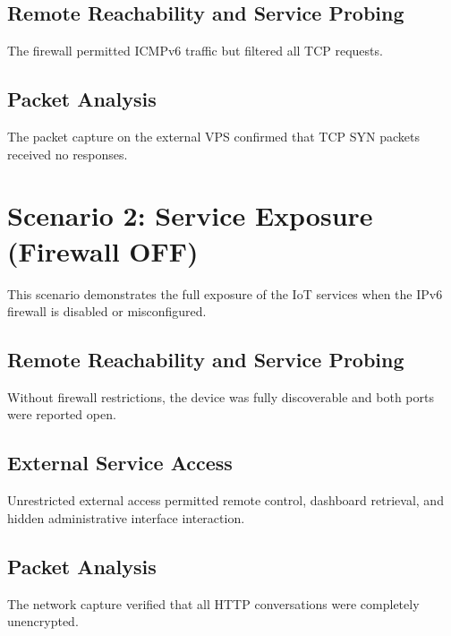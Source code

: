 \subsection{Remote Reachability and Service Probing}
The firewall permitted ICMPv6 traffic but filtered all TCP requests.


\subsection{Packet Analysis}
The packet capture on the external VPS confirmed that TCP SYN packets received no responses.


\section{Scenario 2: Service Exposure (Firewall OFF)}\label{app:results-s2}
This scenario demonstrates the full exposure of the IoT services when the IPv6 firewall is disabled or misconfigured.

\subsection{Remote Reachability and Service Probing}
Without firewall restrictions, the device was fully discoverable and both ports were reported open.


\subsection{External Service Access}
Unrestricted external access permitted remote control, dashboard retrieval, and hidden administrative interface interaction.

\subsection{Packet Analysis}
The network capture verified that all HTTP conversations were completely unencrypted.


